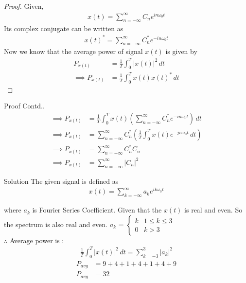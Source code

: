 \documentclass{beamer}
\providecommand{\brak}[1]{\ensuremath{\left(#1\right)}}
\begin{document}
\begin{frame}
\begin{proof}
Given,
\begin{align}
    x(t) = \sum_{n=-\infty}^{\infty}C_{n}e^{in\omega_0t}     
\end{align}
Its complex conjugate can be written as
\begin{align}
    x(t)^* = \sum_{n=-\infty}^{\infty}C_{n}^*e^{-in\omega_0t}
\end{align}
Now we know that the average power of signal $x(t)$ is given by
\begin{align}
    P_{x(t)}&=\frac{1}{T}\int_{0}^{T}\lvert x(t)\rvert^2\,dt\\
    \implies P_{x(t)} &= \frac{1}{T}\int_{0}^{T}x(t)x(t)^*\,dt
\end{align}
\end{proof}
\end{frame}
\begin{frame}
\begin{block}{Proof Contd..}
\begin{align}
    \implies P_{x(t)} &= \frac{1}{T}\int_{0}^{T}x(t)\brak{\sum_{n=-\infty}^{\infty}C_{n}^*e^{-in\omega_0t}}\,dt\\
    \implies P_{x(t)} &= \sum_{n=-\infty}^{\infty}C_{n}^*\brak{\frac{1}{T}\int_{0}^{T}x(t)e^{-jn\omega_0t}\,dt}\\
    \implies P_{x(t)} &= \sum_{n=-\infty}^{\infty}C_{n}^*C_{n}\\
    \implies P_{x(t)} &= \sum_{n=-\infty}^{\infty}\lvert C_n\rvert^2
\end{align}
\end{block}
\end{frame}
\begin{frame}{Solution}
The given signal is defined as 
\begin{align}
    x(t) = \sum_{k=-\infty}^{\infty}a_{k}e^{ik\omega_0t}
\end{align}

where $a_k$ is Fourier Series Coefficient.
Given that the $x(t)$ is real and even. So the spectrum is also real and even.
$a_k$ = $\begin{cases} 
            k & 1\leq k\leq 3\\
            0 & k>3
        \end{cases}$\\  
$\therefore$ Average power is :
\begin{align}
    \frac{1}{T}\int_{0}^{T}\lvert x(t)\rvert^2\,dt = \sum_{k=-3}^{3}\lvert a_k\rvert^2
\end{align}
\begin{align}
    P_{avg} &= 9+4+1+4+1+4+9\\
    P_{avg} &= 32
\end{align}
\end{frame}
\end{document}
